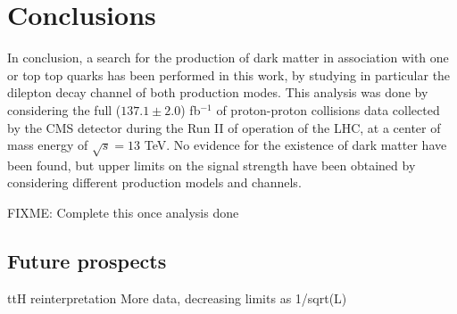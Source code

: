 \documentclass[a4paper, 10pt, openright]{report}
\begin{document}
\chapter{Conclusions} \label{chapter:Conclusion}

In conclusion, a search for the production of dark matter in association with one or top top quarks has been performed in this work, by studying in particular the dilepton decay channel of both production modes. This analysis was done by considering the full ($137.1 \pm 2.0$) fb$^{-1}$ of proton-proton collisions data collected by the \ac{CMS} detector during the Run II of operation of the \ac{LHC}, at a center of mass energy of $\sqrt{s} = 13$ TeV. No evidence for the existence of dark matter have been found, but upper limits on the signal strength have been obtained by considering different production models and channels.

\color{red} FIXME: Complete this once analysis done \color{black}

\section{Future prospects}

ttH reinterpretation
More data, decreasing limits as 1/sqrt(L)
\end{document}
